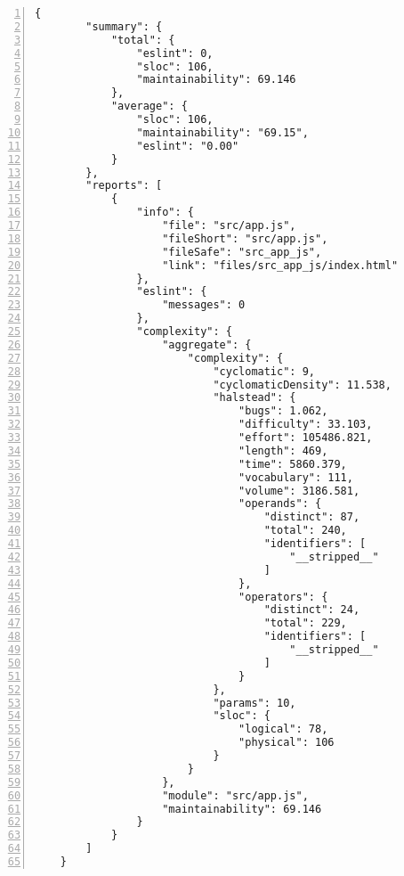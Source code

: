 \begin{appendices}
	\begin{lstlisting}[numbers=left]
	{
		"summary": {
			"total": {
				"eslint": 0,
				"sloc": 106,
				"maintainability": 69.146
			},
			"average": {
				"sloc": 106,
				"maintainability": "69.15",
				"eslint": "0.00"
			}
		},
		"reports": [
			{
				"info": {
					"file": "src/app.js",
					"fileShort": "src/app.js",
					"fileSafe": "src_app_js",
					"link": "files/src_app_js/index.html"
				},
				"eslint": {
					"messages": 0
				},
				"complexity": {
					"aggregate": {
						"complexity": {
							"cyclomatic": 9,
							"cyclomaticDensity": 11.538,
							"halstead": {
								"bugs": 1.062,
								"difficulty": 33.103,
								"effort": 105486.821,
								"length": 469,
								"time": 5860.379,
								"vocabulary": 111,
								"volume": 3186.581,
								"operands": {
									"distinct": 87,
									"total": 240,
									"identifiers": [
										"__stripped__"
									]
								},
								"operators": {
									"distinct": 24,
									"total": 229,
									"identifiers": [
										"__stripped__"
									]
								}
							},
							"params": 10,
							"sloc": {
								"logical": 78,
								"physical": 106
							}
						}
					},
					"module": "src/app.js",
					"maintainability": 69.146
				}
			}
		]
	}
	\end{lstlisting}
\end{appendices}